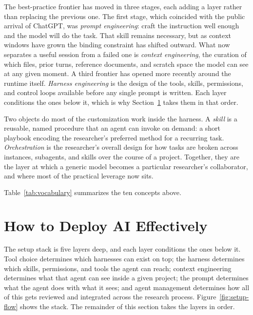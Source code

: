 \documentclass[11pt]{article}
\begin{document}
The best-practice frontier has moved in three stages, each adding a layer rather than replacing the previous one. The first stage, which coincided with the public arrival of ChatGPT, was \emph{prompt engineering}: craft the instruction well enough and the model will do the task. That skill remains necessary, but as context windows have grown the binding constraint has shifted outward. What now separates a useful session from a failed one is \emph{context engineering}, the curation of which files, prior turns, reference documents, and scratch space the model can see at any given moment. A third frontier has opened more recently around the runtime itself. \emph{Harness engineering} is the design of the tools, skills, permissions, and control loops available before any single prompt is written. Each layer conditions the ones below it, which is why Section~\ref{sec:deploy} takes them in that order.

Two objects do most of the customization work inside the harness. A \emph{skill} is a reusable, named procedure that an agent can invoke on demand: a short playbook encoding the researcher's preferred method for a recurring task. \emph{Orchestration} is the researcher's overall design for how tasks are broken across instances, subagents, and skills over the course of a project. Together, they are the layer at which a generic model becomes a particular researcher's collaborator, and where most of the practical leverage now sits.

Table~\ref{tab:vocabulary} summarizes the ten concepts above.


\section{How to Deploy AI Effectively}
\label{sec:deploy}

The setup stack is five layers deep, and each layer conditions the ones below it. Tool choice determines which harnesses can exist on top; the harness determines which skills, permissions, and tools the agent can reach; context engineering determines what that agent can see inside a given project; the prompt determines what the agent does with what it sees; and agent management determines how all of this gets reviewed and integrated across the research process. Figure~\ref{fig:setup-flow} shows the stack. The remainder of this section takes the layers in order.
\end{document}
